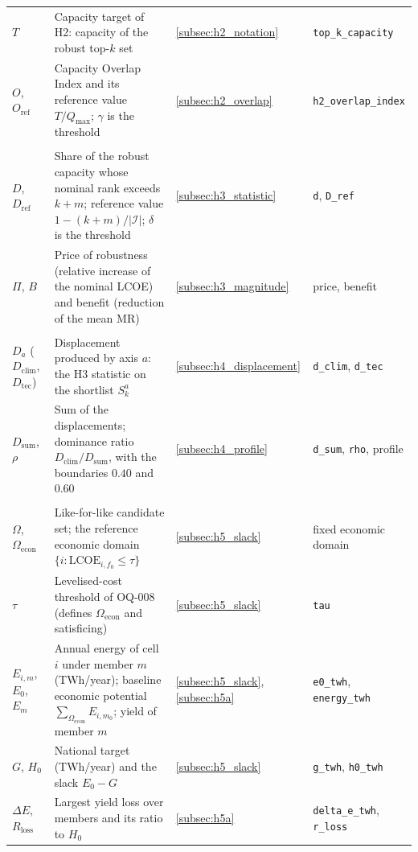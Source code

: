 \begin{longtable}{@{}p{}p{}p{}p{}@{}}
$T$ & Capacity target of H2: capacity of the robust top-$k$ set & \ref{subsec:h2_notation} & \texttt{top\_k\_capacity} \\
$O$, $O_{\mathrm{ref}}$ & Capacity Overlap Index and its reference value $T/Q_{\max}$; $\gamma$ is the threshold & \ref{subsec:h2_overlap} & \texttt{h2\_overlap\_index} \\
\addlinespace
\multicolumn{4}{@{}l}{\textit{H3}}\\
$D$, $D_{\mathrm{ref}}$ & Share of the robust capacity whose nominal rank exceeds $k+m$; reference value $1-(k+m)/|\mathcal{I}|$; $\delta$ is the threshold & \ref{subsec:h3_statistic} & \texttt{d}, \texttt{D\_ref} \\
$\Pi$, $B$ & Price of robustness (relative increase of the nominal LCOE) and benefit (reduction of the mean $\mathrm{MR}$) & \ref{subsec:h3_magnitude} & price, benefit \\
\addlinespace
\multicolumn{4}{@{}l}{\textit{H4}}\\
$D_a$ ($D_{\mathrm{clim}}$, $D_{\mathrm{tec}}$) & Displacement produced by axis $a$: the H3 statistic on the shortlist $S^a_k$ & \ref{subsec:h4_displacement} & \texttt{d\_clim}, \texttt{d\_tec} \\
$D_{\mathrm{sum}}$, $\rho$ & Sum of the displacements; dominance ratio $D_{\mathrm{clim}}/D_{\mathrm{sum}}$, with the boundaries $0.40$ and $0.60$ & \ref{subsec:h4_profile} & \texttt{d\_sum}, \texttt{rho}, profile \\
\addlinespace
\multicolumn{4}{@{}l}{\textit{H5}}\\
$\Omega$, $\Omega_{\mathrm{econ}}$ & Like-for-like candidate set; the reference economic domain $\{i:\mathrm{LCOE}_{i,f_0}\leq\tau\}$ & \ref{subsec:h5_slack} & fixed economic domain \\
$\tau$ & Levelised-cost threshold of OQ-008 (defines $\Omega_{\mathrm{econ}}$ and satisficing) & \ref{subsec:h5_slack} & \texttt{tau} \\
$E_{i,m}$, $E_0$, $E_m$ & Annual energy of cell $i$ under member $m$ (TWh/year); baseline economic potential $\sum_{\Omega_{\mathrm{econ}}}E_{i,m_0}$; yield of member $m$ & \ref{subsec:h5_slack}, \ref{subsec:h5a} & \texttt{e0\_twh}, \texttt{energy\_twh} \\
$G$, $H_0$ & National target (TWh/year) and the slack $E_0-G$ & \ref{subsec:h5_slack} & \texttt{g\_twh}, \texttt{h0\_twh} \\
$\Delta E$, $R_{\mathrm{loss}}$ & Largest yield loss over members and its ratio to $H_0$ & \ref{subsec:h5a} & \texttt{delta\_e\_twh}, \texttt{r\_loss} \\

\end{longtable}
